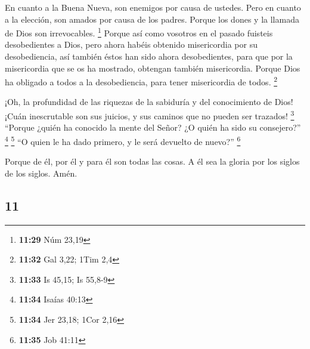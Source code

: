 \begin{paracol}{2}
 En cuanto a la Buena Nueva, son enemigos por causa de
ustedes. Pero en cuanto a la elección, son amados por causa de los
padres.  Porque los dones y la llamada de Dios son
irrevocables. \footnote{\textbf{11:29} Núm 23,19}  Porque
así como vosotros en el pasado fuisteis desobedientes a Dios, pero ahora
habéis obtenido misericordia por su desobediencia,  así
también éstos han sido ahora desobedientes, para que por la misericordia
que se os ha mostrado, obtengan también misericordia. 
Porque Dios ha obligado a todos a la desobediencia, para tener
misericordia de todos. \footnote{\textbf{11:32} Gal 3,22; 1Tim 2,4}

 ¡Oh, la profundidad de las riquezas de la sabiduría y
del conocimiento de Dios! ¡Cuán inescrutable son sus juicios, y sus
caminos que no pueden ser trazados! \footnote{\textbf{11:33} Is 45,15;
  Is 55,8-9}  ``Porque ¿quién ha conocido la mente del
Señor? ¿O quién ha sido su consejero?'' \footnote{\textbf{11:34} Isaías
  40:13} \footnote{\textbf{11:34} Jer 23,18; 1Cor 2,16} 
``O quien le ha dado primero, y le será devuelto de nuevo?'' \footnote{\textbf{11:35}
  Job 41:11}

 Porque de él, por él y para él son todas las cosas. A él
sea la gloria por los siglos de los siglos. Amén.

\switchcolumn
\begin{otherlanguage}{english}

\hypertarget{section-21}{%
\section{11}\label{section-21}}


\end{otherlanguage}
\end{paracol}
